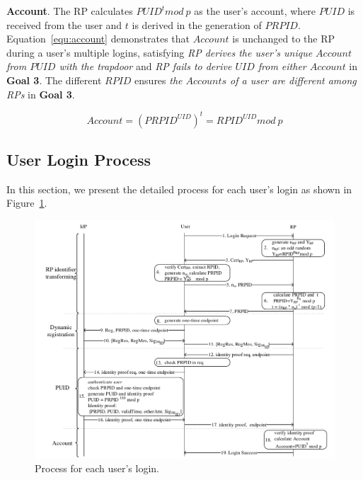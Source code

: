 \noindent\textbf{Account}. The RP calculates $PUID^t mod \ p$ as the  user's account, where $PUID$ is received from the user and $t$ is derived in the generation of $PRPID$. Equation~\ref{equ:account} demonstrates that $Account$ is unchanged to the RP during a user's multiple logins, satisfying \emph{RP derives the user's unique $Account$  from $PUID$ with the  trapdoor} and  \emph{RP fails to derive $UID$ from either $Account$} in \textbf{Goal 3}. The different $RPID$ ensures \emph{the $Accounts$ of a user are different among RPs} in \textbf{Goal 3}.

 \begin{equation}
   Account = ({PRPID}^{UID})^t = {RPID}^{UID} mod \ p
   \label{equ:account}
   \end{equation}


\subsection{User Login Process}
\label{sebsec:loginprocess}
In this section, we present the detailed process for each user's login as shown in Figure~\ref{fig:process}. %

\begin{figure}
  \centering
  \includegraphics[width=0.85\linewidth]{fig/process.pdf}
  \caption{Process for each user's login.}
  \label{fig:process}
\end{figure}


